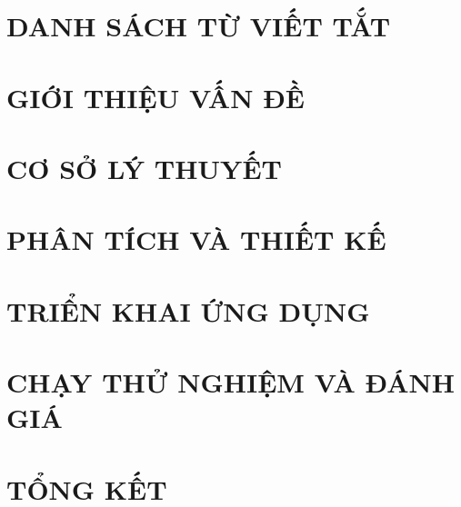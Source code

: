 \documentclass[a4paper,12pt,oneside]{report}
\begin{document}
\chapter*{DANH SÁCH TỪ VIẾT TẮT}
{}


\clearpage
{}          %


\chapter{GIỚI THIỆU VẤN ĐỀ}

\chapter{CƠ SỞ LÝ THUYẾT}

\chapter{PHÂN TÍCH VÀ THIẾT KẾ}

\chapter{TRIỂN KHAI ỨNG DỤNG}

\chapter{CHẠY THỬ NGHIỆM VÀ ĐÁNH GIÁ}

\chapter{TỔNG KẾT}

\clearpage
{}
{}
\end{document}
